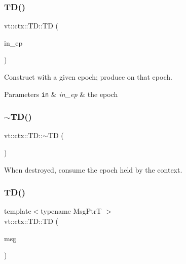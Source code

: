 \subsubsection{\texorpdfstring{T\+D()}{TD()}\hspace{0.1cm}{\footnotesize\ttfamily [1/2]}}
{\footnotesize\ttfamily vt\+::ctx\+::\+T\+D\+::\+TD (\begin{DoxyParamCaption}\item[{\hyperlink{namespacevt_a81d11b28122d43bf9834577e4a06440f}{Epoch\+Type}}]{in\+\_\+ep }\end{DoxyParamCaption})\hspace{0.3cm}{\ttfamily [explicit]}}



Construct with a given epoch; produce on that epoch. 


\begin{DoxyParams}[1]{Parameters}
\mbox{\tt in}  & {\em in\+\_\+ep} & the epoch \\
\hline
\end{DoxyParams}
\mbox{\label{structvt_1_1ctx_1_1_t_d_a7682445c6790c8176124c080c3ca340c}} 
\subsubsection{\texorpdfstring{$\sim$\+T\+D()}{~TD()}}
{\footnotesize\ttfamily vt\+::ctx\+::\+T\+D\+::$\sim$\+TD (\begin{DoxyParamCaption}{ }\end{DoxyParamCaption})\hspace{0.3cm}{\ttfamily [virtual]}}



When destroyed, consume the epoch held by the context. 

\mbox{\label{structvt_1_1ctx_1_1_t_d_a59c6dbce4737da7d99a9175be2ed9053}} 
\subsubsection{\texorpdfstring{T\+D()}{TD()}\hspace{0.1cm}{\footnotesize\ttfamily [2/2]}}
{\footnotesize\ttfamily template$<$typename Msg\+PtrT $>$ \\
vt\+::ctx\+::\+T\+D\+::\+TD (\begin{DoxyParamCaption}\item[{Msg\+PtrT}]{msg }\end{DoxyParamCaption})\hspace{0.3cm}{\ttfamily [explicit]}}



